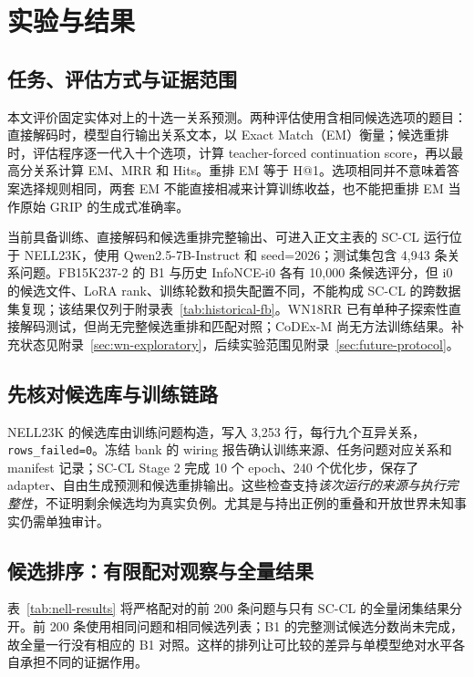 \section{实验与结果}

\subsection{任务、评估方式与证据范围}

本文评价固定实体对上的十选一关系预测。两种评估使用含相同候选选项的题目：直接解码时，模型自行输出关系文本，以 Exact Match（EM）衡量；候选重排时，评估程序逐一代入十个选项，计算 teacher-forced continuation score，再以最高分关系计算 EM、MRR 和 Hits。重排 EM 等于 H@1。选项相同并不意味着答案选择规则相同，两套 EM 不能直接相减来计算训练收益，也不能把重排 EM 当作原始 GRIP 的生成式准确率。

当前具备训练、直接解码和候选重排完整输出、可进入正文主表的 SC-CL 运行位于 NELL23K，使用 Qwen2.5-7B-Instruct 和 seed=2026；测试集包含 4,943 条关系问题。FB15K237-2 的 B1 与历史 InfoNCE-i0 各有 10,000 条候选评分，但 i0 的候选文件、LoRA rank、训练轮数和损失配置不同，不能构成 SC-CL 的跨数据集复现；该结果仅列于附录表~\ref{tab:historical-fb}。WN18RR 已有单种子探索性直接解码测试，但尚无完整候选重排和匹配对照；CoDEx-M 尚无方法训练结果。补充状态见附录~\ref{sec:wn-exploratory}，后续实验范围见附录~\ref{sec:future-protocol}。

\subsection{先核对候选库与训练链路}

NELL23K 的候选库由训练问题构造，写入 3,253 行，每行九个互异关系，\texttt{rows\_failed=0}。冻结 bank 的 wiring 报告确认训练来源、任务问题对应关系和 manifest 记录；SC-CL Stage 2 完成 10 个 epoch、240 个优化步，保存了 adapter、自由生成预测和候选重排输出。这些检查支持\emph{该次运行的来源与执行完整性}，不证明剩余候选均为真实负例。尤其是与持出正例的重叠和开放世界未知事实仍需单独审计。

\subsection{候选排序：有限配对观察与全量结果}

表~\ref{tab:nell-results} 将严格配对的前 200 条问题与只有 SC-CL 的全量闭集结果分开。前 200 条使用相同问题和相同候选列表；B1 的完整测试候选分数尚未完成，故全量一行没有相应的 B1 对照。这样的排列让可比较的差异与单模型绝对水平各自承担不同的证据作用。

